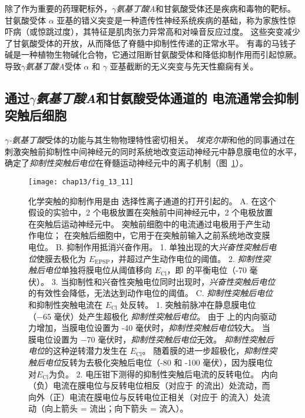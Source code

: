 除了作为重要的药理靶标外，\textit{$\gamma$氨基丁酸A}和甘氨酸受体还是疾病和毒物的靶标。
甘氨酸受体 $\alpha$ 亚基的错义突变是一种遗传性神经系统疾病的基础，称为家族性惊吓病（或惊跳过度），其特征是肌肉张力异常高和对噪音反应过度。
这些突变减少了甘氨酸受体的开放，从而降低了脊髓中抑制性传递的正常水平。
有毒的马钱子碱是一种植物生物碱化合物，它通过阻断甘氨酸受体和降低抑制作用而引起惊厥。
导致\textit{$\gamma$氨基丁酸A}受体 $\alpha$ 和 $\gamma$ 亚基截断的无义突变与先天性癫痫有关。



\subsection{通过\textit{$\gamma$氨基丁酸A}和甘氨酸受体通道的  电流通常会抑制突触后细胞}

\textit{$\gamma$-氨基丁酸}受体的功能与其生物物理特性密切相关。
\textit{埃克尔斯}和他的同事通过在刺激突触前抑制性中间神经元的同时系统地改变运动神经元中静息膜电位的水平，确定了\textit{抑制性突触后电位}在脊髓运动神经元中的离子机制（图~\ref{fig:13_11}）。


\begin{figure}[htbp]
	\centering
	\texttt{[image: chap13/fig\_13\_11]}
	\caption{化学突触的抑制作用是由  选择性离子通道的打开引起的。
		A. 在这个假设的实验中，2 个电极放置在突触前中间神经元中，2 个电极放置在突触后运动神经元中。
		突触前细胞中的电流通过电极用于产生动作电位；
		在突触后细胞中，它用于在突触前输入之前系统地改变膜电位。
		B. 抑制作用抵消兴奋作用。
		1. 单独出现的大\textit{兴奋性突触后电位}使膜去极化为 $E_{\text{EPSP}}$，并超过产生动作电位的阈值。
		2. \textit{抑制性突触后电位}单独将膜电位从阈值移向 $E_\text{Cl}$，即  的平衡电位（-70 毫伏）。
		3. 当抑制性和兴奋性突触电位同时出现时，\textit{兴奋性突触后电位}的有效性会降低，无法达到动作电位的阈值。
		C. \textit{抑制性突触后电位}和抑制性突触电流在 $E_\text{Cl}$ 处反转。
		1. 突触前脉冲在静息膜电位（−65 毫伏）处产生超极化 \textit{抑制性突触后电位}。
		由于  上的内向驱动力增加，当膜电位设置为 -40 毫伏时，\textit{抑制性突触后电位}较大。
		当膜电位设置为 −70 毫伏时，\textit{抑制性突触后电位}无效。
		\textit{抑制性突触后电位}的这种逆转潜力发生在 $E_\text{Cl}$。
		随着膜的进一步超极化，\textit{抑制性突触后电位}反转为去极化突触后电位（-80 和 -100 毫伏），因为膜电位对$E_\text{Cl}$为负。
		2. 电压钳下测得的抑制性突触后电流的反转电位。
		内向（负）电流在膜电位与反转电位相反（对应于  的流出）处流动，而向外（正）电流在膜电位与反转电位正相关（对应于  的流入）处流动（向上箭头 = 流出；向下箭头 = 流入）。}
	\label{fig:13_11}
\end{figure}


